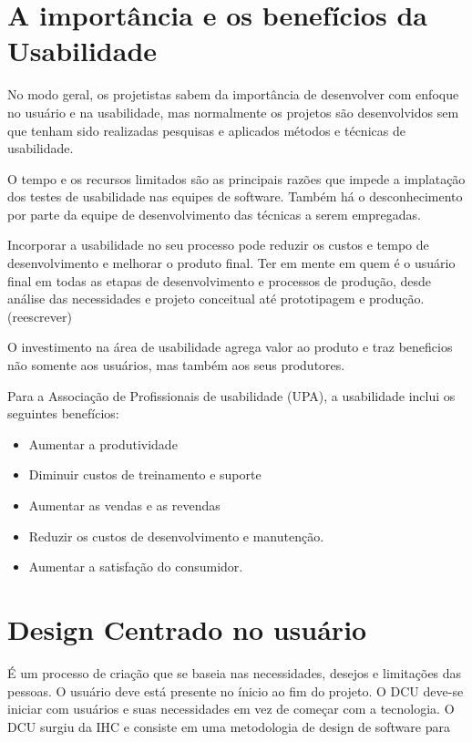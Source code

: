 \section{A importância e os benefícios da Usabilidade}

No modo geral, os projetistas sabem da importância de desenvolver com enfoque no usuário e na usabilidade, mas normalmente os projetos são desenvolvidos sem que tenham sido realizadas pesquisas e aplicados métodos e técnicas de usabilidade.
	
	O tempo e os recursos limitados são as principais razões que impede a implatação dos testes de usabilidade nas equipes de software. Também há o desconhecimento por parte da equipe de desenvolvimento das técnicas a serem empregadas.

Incorporar a usabilidade no seu processo pode reduzir os custos e tempo de desenvolvimento e melhorar o produto final. Ter em mente  em quem é o usuário final em todas as etapas de desenvolvimento e processos de produção, desde análise das necessidades e projeto conceitual até prototipagem e produção.  (reescrever)

	O investimento na área de usabilidade agrega valor ao produto e traz beneficios não somente aos usuários, mas também aos seus produtores. 

Para a Associação de Profissionais de usabilidade (UPA), a usabilidade inclui os seguintes benefícios:

\begin{itemize}
\item Aumentar a produtividade
\item Diminuir custos de treinamento e suporte
\item Aumentar as vendas e as revendas
\item Reduzir os custos de desenvolvimento e manutenção.
\item Aumentar a satisfação do consumidor.
\end{itemize}


\section{Design Centrado no usuário}

É um processo de criação que se baseia nas necessidades, desejos e limitações das pessoas. O usuário deve está presente no ínicio ao fim do projeto.
O DCU deve-se iniciar com usuários e suas necessidades em vez de começar com a tecnologia.
O DCU surgiu da IHC e consiste em uma metodologia de design de software para 

